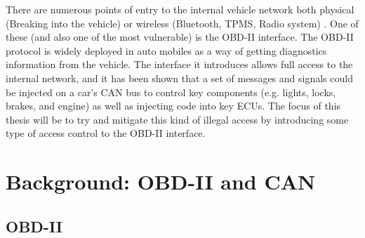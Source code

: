 \documentclass[11pt]{article}
\begin{document}
There are numerous points of entry to the internal vehicle network both physical (Breaking into the vehicle) or wireless (Bluetooth, TPMS, Radio system) \cite{Yadav16}. One of these (and also one of the most vulnerable) is the OBD-II interface. The OBD-II protocol is widely deployed in auto mobiles as a way of getting diagnostics information from the vehicle. The interface it introduces allows full access to the internal network, and it has been shown \cite{Yadav16}\cite{MillerA}\cite{MillerB}\cite{MillerC} that a set of messages and signals could be injected on a car's CAN bus to control key components (e.g. lights, locks, brakes, and engine) as well as injecting code into key ECUs. The focus of this thesis will be to try and mitigate this kind of illegal access by introducing some type of access control to the OBD-II interface.

\section{Background: OBD-II and CAN}

\subsection{OBD-II}
\end{document}
